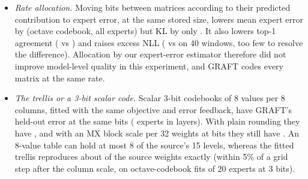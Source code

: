 \begin{itemize}[leftmargin=1.1em,itemsep=1pt,topsep=2pt]
the octave codebook ( against  per weight on B200), and at 3.5 bits they are ahead
(above).
\item \emph{Rate allocation.} Moving bits between matrices according to their predicted contribution to expert
error, at the same stored size, lowers mean expert error by  (octave codebook, all experts) but KL
by only . It also lowers top-1 agreement ( vs ) and raises excess NLL
( vs  on 40 windows, too few to resolve the difference). Allocation by our
expert-error estimator therefore did not improve model-level quality in this experiment, and GRAFT codes every
matrix at the same rate.
\item \emph{The trellis or a 3-bit scalar code.} Scalar 3-bit codebooks of 8 values per 8 columns, fitted with the
same objective and error feedback, have  GRAFT's held-out error at the same bits (
experts in  layers). With plain rounding they have , and with an MX block
scale per 32 weights at  bits they still have . An 8-value table can hold at
most 8 of the source's 15 levels, whereas the fitted trellis reproduces about  of the source weights
exactly (within 5\% of a grid step after the column scale, on octave-codebook fits of 20 experts at 3 bits).
\end{itemize}


